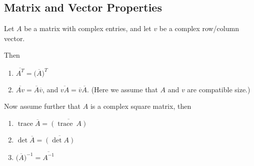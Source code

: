 \documentclass[12pt]{article}
\newcommand{\ccj}[1]{\overline{#1}}
\newcommand{\trace}[0]{\operatorname{trace}}
\begin{document}
\subsection{Matrix and Vector Properties}

Let $A$ be a matrix with complex entries, and let $v$ be a complex row/column vector. 

Then
\begin{enumerate}
 \item $\ccj{A^T}=\big(\ccj{A}\big)^T$
 \item $\ccj{Av}=\ccj{A}\ccj{v}$, and $\ccj{vA}=\ccj{v}\ccj{A}$. (Here we assume that $A$ and $v$ are
compatible size.)
\end{enumerate}

Now assume further that $A$ is a complex square matrix, then

\begin{enumerate}
 \item $\trace \ccj{A} = \ccj{(\trace\ A)}$
 \item $\det \ccj{A} = \ccj{(\det A)}$
 \item $\big(\ccj{A}\big)^{-1} = \ccj{A^{-1}}$
\end{enumerate}
\end{document}
